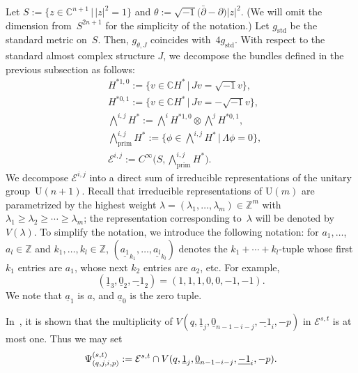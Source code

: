 \documentclass[pdftex]{sigma}
\numberwithin{equation}{section}
\DeclareMathOperator{\prim}{prim}
\newcommand{\bC}{\mathbb{C}}
\newcommand{\cE}{\mathcal{E}}
\begin{document}
Let $S :=\{ z \in \bC^{n+1} \,|\, |z|^2 =1 \}$
and
$\theta:= \sqrt{-1} \big(\bar{\partial } - \partial \big)|z|^2$.
(We will omit the dimension from~$S^{2n+1}$ for the simplicity of the notation.)
Let $g_{\mathrm{std}}$ be the standard metric on~$S$.
Then, $g_{\theta , J}$ coincides with~$4 g_{\mathrm{std}}$.
With respect to the standard almost complex structure $J$, we decompose the bundles defined in the previous subsection as follows:
\begin{align*}
& H^{* 1,0}:= \big\{ v \in \bC H^* \,|\, Jv = \sqrt{-1} v \big\} , \\
%
%
& H^{* 0,1} := \big\{ v \in \bC H^* \,|\, Jv = - \sqrt{-1} v \big\}, \\
%
%
& \textstyle \bigwedge^{i, j} H^* := \textstyle \bigwedge^{i} H^{* 1,0} \otimes \textstyle \bigwedge^{j} H^{* 0,1} , \\
%
%
& \textstyle \bigwedge_{\prim}^{i, j} H^* := \big\{ \phi \in \textstyle \bigwedge^{i, j} H^* \, \big| \, \Lambda \phi =0 \big\} , \\
%
%
%
%
& \cE ^{i, j} := C^{\infty} \big( S, \textstyle \bigwedge_{\prim}^{i, j} H^* \big).
\end{align*}
%
We decompose $\cE ^{i,j} $ into a direct sum of irreducible representations of the unitary group~$\mathrm{U} (n+1)$.
Recall that
irreducible representations of $\mathrm{U} (m)$ are parametrized by the highest weight $\lambda = (\lambda_1 , \ldots , \lambda_m ) \in \mathbb{Z}^m$ with $\lambda_1 \geq \lambda_2 \geq \cdots \geq \lambda_m$; the representation corresponding to~$\lambda$ will be denoted by
$ V ( \lambda ) $.
To simplify the notation, we introduce the following notation:
for $a_1, \ldots $, $a_l \in \mathbb{Z}$ and $k_1, \ldots , k_l \in \mathbb{Z}$, $(\underline{a_1}_{k_1}, \dots , \underline{a_l}_{k_l})$ denotes the $k_1 + \cdots + k_l $-tuple
whose first $k_1$ entries are $a_1$, whose next $k_2$ entries are $a_2$, etc.
For example,{\samepage
\[
(\underline{1}_{3}, \underline{0}_{2}, \underline{-1}_{2} ) = (1, 1, 1, 0, 0, -1, -1 ).
\]
We note that $\underline{a}_{1}$ is $a$, and $\underline{a}_{0}$ is the zero tuple.}

In~\cite{Julg-Kasparov-95}, it is shown that
the multiplicity of $V (q, \underline{1}_{j}, \underline{0}_{n-1-i-j}, \underline{-1}_{i}, -p )$ in $\cE ^{s,t}$
is at most one.
Thus we may set
\begin{equation}
\Psi_{(q , j , i , p )}^{(s, t)}
:= \cE ^{s,t}
\cap V (q, \underline{1}_{j}, \underline{0}_{n-1-i-j}, \underline{-1}_{i}, -p )
.
\notag
\end{equation}
\end{document}

